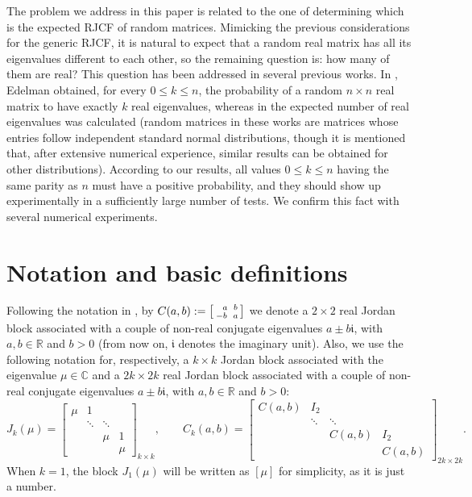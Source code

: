 \documentclass[a4paper]{article}
\newcommand{\R}{\mathbb R}
\newcommand{\C}{\mathbb C}
\newcommand{\ii}{\mathfrak i}
\begin{document}
The problem we address in this paper is related to the one of determining which is the expected RJCF of random matrices. Mimicking the previous considerations for the generic RJCF, it is natural to expect that a random real matrix has all its eigenvalues different to each other, so the remaining question is: how many of them are real? This question has been addressed in several previous works. In \cite{edelman97}, Edelman obtained, for every $0 \leq k\leq n$, the probability of a random $n\times n$ real matrix to have exactly $k$ real eigenvalues, whereas in \cite{eks94} the expected number of real eigenvalues was calculated (random matrices in these works are matrices whose entries follow independent standard normal distributions, though it is mentioned that, after extensive numerical experience, similar results can be obtained for other distributions). According to our results, all values $0 \leq k\leq n$ having the same parity as $n$ must have a positive probability, and they should show up experimentally in a sufficiently large number of tests. We confirm this fact with several numerical experiments.

\section{Notation and basic definitions}\label{basic.sec}

Following the notation in \cite{hj13}, by $C(a,b):=\begin{bsmallmatrix}
        \phantom{-}a&\phantom{!}b\\-b&\phantom{!}a
    \end{bsmallmatrix}$ we denote a $2\times2$ real Jordan block associated with a couple of non-real conjugate eigenvalues $a\pm b\ii$, with $a,b\in\R$ and $b>0$ (from now on, $\ii$ denotes the imaginary unit). Also, we use the following notation for, respectively, a $k\times k$ Jordan block associated with the eigenvalue $\mu\in\C$ and a $2k\times 2k$  real Jordan block associated with a couple of non-real conjugate eigenvalues $a\pm b\ii$, with $a,b\in\R$ and $b>0$:
\begin{equation}\label{jordanblocks}
    J_k(\mu)=\begin{bmatrix}
        \mu&1\\&\ddots&\ddots\\&&\mu&1\\&&&\mu
    \end{bmatrix}_{k\times k},\qquad C_k(a,b)=\begin{bmatrix}
        C(a,b)&I_2\\&\ddots&\ddots\\&&C(a,b)&I_2\\&&&C(a,b)
    \end{bmatrix}_{2k\times2k}.
\end{equation}
When $k=1$, the block $J_1(\mu)$ will be written as $[\mu]$ for simplicity, as it is just a number.
\end{document}
